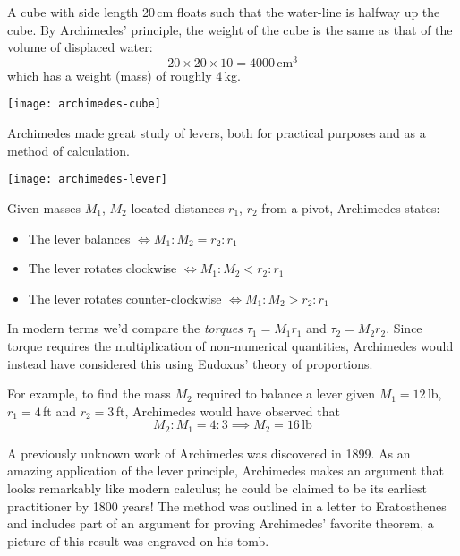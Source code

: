\begin{minipage}[t]{0.69\linewidth}\vspace{0pt}
	A cube with side length 20\,cm floats such that the water-line is halfway up the cube. By Archimedes' principle, the weight of the cube is the same as that of the volume of displaced water:
	\[
		20\times 20\times 10=4000\,\text{cm}^3
	\]
	which has a weight (mass) of roughly 4\,kg.
\end{minipage}
\hfill
\begin{minipage}[t]{0.3\linewidth}\vspace{0pt}
	\flushright
	\texttt{[image: archimedes-cube]}
\end{minipage}




Archimedes made great study of levers, both for practical purposes and as a method of calculation.

\begin{center}
	\texttt{[image: archimedes-lever]}
\end{center}

Given masses $M_1$, $M_2$ located distances $r_1$, $r_2$ from a pivot, Archimedes states:
\begin{itemize}%
  \item The lever balances $\iff M_1:M_2=r_2:r_1$
  \item The lever rotates clockwise $\iff M_1:M_2<r_2:r_1$
  \item The lever rotates counter-clockwise $\iff M_1:M_2>r_2:r_1$
\end{itemize}
In modern terms we'd compare the \emph{torques} $\tau_1=M_1r_1$ and $\tau_2=M_2r_2$. Since torque requires the multiplication of non-numerical quantities, Archimedes would instead have considered this using Eudoxus' theory of proportions.\par
For example, to find the mass $M_2$ required to balance a lever given $M_1=12$\,lb, $r_1=4$\,ft and $r_2=3$\,ft, Archimedes would have observed that
\[
	M_2:M_1=4:3\implies M_2=16\,\text{lb}
\]
\goodbreak



A previously unknown work of Archimedes was discovered in 1899. As an amazing application of the lever principle, Archimedes makes an argument that looks remarkably like modern calculus; he could be claimed to be its earliest practitioner by 1800 years! The method was outlined in a letter to Eratosthenes and includes part of an argument for proving Archimedes' favorite theorem, a picture of this result was engraved on his tomb.

